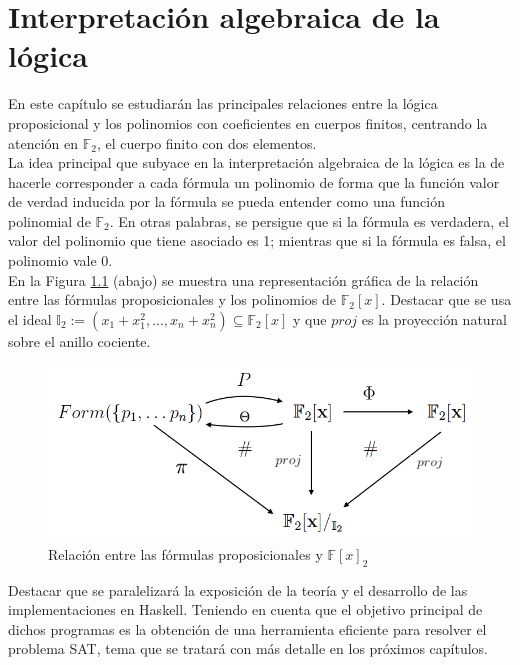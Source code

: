 \chapter{Interpretación algebraica de la lógica}\label{sec:interp}

En este capítulo se estudiarán las principales relaciones entre la lógica proposicional y los 
polinomios con coeficientes en cuerpos finitos, centrando la atención en $\mathbb{F}_2$, 
el cuerpo finito con dos elementos.\\

La idea principal que subyace en la interpretación algebraica de la lógica es la de hacerle corresponder a cada fórmula un polinomio de forma que la función valor de verdad inducida por la fórmula se pueda entender como una función polinomial de $\mathbb{F}_2$. En otras palabras, se persigue que si la fórmula es verdadera, el valor del polinomio que tiene asociado es 1; mientras que si la fórmula es falsa, el polinomio vale 0.\\

En la Figura \ref{fig:esquema} (abajo) se muestra una representación gráfica de la relación entre las fórmulas proposicionales y los polinomios de $\mathbb{F}_2[x]$. Destacar que se usa el ideal $\mathbb{I}_2 :=(x_1+x_1^2,...,x_n+x_n^2)\subseteq\mathbb{F}_2[x]$ y que $proj$ es la proyección natural sobre el anillo cociente.

\vspace{0.5cm}
\begin{figure}[h]
	\centering
		\includegraphics[scale=0.46]{imagenes/conmu.png}
	\caption{Relación entre las fórmulas proposicionales y $\mathbb{F}[x]_2$}
	\label{fig:esquema}
\end{figure}
\vspace{0.5cm}

Destacar que se paralelizará la exposición de la teoría y el desarrollo de las implementaciones en Haskell. Teniendo en cuenta que el objetivo principal de dichos programas es la obtención de una herramienta eficiente para resolver el problema SAT, tema que se tratará con más detalle en los próximos capítulos.
 
